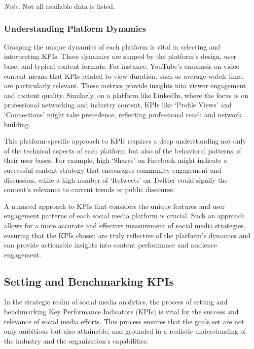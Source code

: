 \documentclass[
]{book}
\begin{document}
\emph{Note.} Not all available data is listed.

\hypertarget{understanding-platform-dynamics}{%
\subsubsection*{Understanding Platform Dynamics}\label{understanding-platform-dynamics}}

Grasping the unique dynamics of each platform is vital in selecting and interpreting KPIs. These dynamics are shaped by the platform's design, user base, and typical content formats. For instance, YouTube's emphasis on video content means that KPIs related to view duration, such as average watch time, are particularly relevant. These metrics provide insights into viewer engagement and content quality. Similarly, on a platform like LinkedIn, where the focus is on professional networking and industry content, KPIs like `Profile Views' and `Connections' might take precedence, reflecting professional reach and network building.

This platform-specific approach to KPIs requires a deep understanding not only of the technical aspects of each platform but also of the behavioral patterns of their user bases. For example, high `Shares' on Facebook might indicate a successful content strategy that encourages community engagement and discussion, while a high number of `Retweets' on Twitter could signify the content's relevance to current trends or public discourse.

A nuanced approach to KPIs that considers the unique features and user engagement patterns of each social media platform is crucial. Such an approach allows for a more accurate and effective measurement of social media strategies, ensuring that the KPIs chosen are truly reflective of the platform's dynamics and can provide actionable insights into content performance and audience engagement.

\hypertarget{setting-and-benchmarking-kpis}{%
\subsection*{Setting and Benchmarking KPIs}\label{setting-and-benchmarking-kpis}}

In the strategic realm of social media analytics, the process of setting and benchmarking Key Performance Indicators (KPIs) is vital for the success and relevance of social media efforts. This process ensures that the goals set are not only ambitious but also attainable, and grounded in a realistic understanding of the industry and the organization's capabilities.
\end{document}
